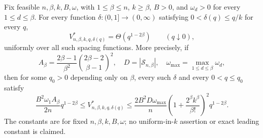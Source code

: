 Fix feasible \(n,\beta,k,B,\omega\), with \(1\le\beta\le n\), \(k\ge\beta\), \(B>0\), and \(\omega_d>0\) for every \(1\le d\le\beta\).  For every function \(\delta:(0,1]\to(0,\infty)\) satisfying \(0<\delta(q)\le q/k\) for every \(q\),
\[
V^*_{n,\beta,k,q,\delta(q)}=\Theta(q^{1-2\beta})
\qquad(q\downarrow0),
\]
uniformly over all such spacing functions.  More precisely, if
\[
A_\beta=\frac{2\beta-1}{\beta^2}
\binom{2\beta-2}{\beta-1}^{\!2},
\quad D=|\mathcal S_{n,\beta}|,
\quad \omega_{\max}=\max_{1\le d\le\beta}\omega_d,
\]
then for some \(q_0>0\) depending only on \(\beta\), every such \(\delta\) and every \(0<q\le q_0\) satisfy
\[
\frac{B^2\omega_1A_\beta}{2n}q^{1-2\beta}
\le V^*_{n,\beta,k,q,\delta(q)}
\le\frac{2B^2D\omega_{\max}}{n}
\left(1+\frac{2^\beta k^\beta}{\beta!}\right)^2q^{1-2\beta}.
\]
The constants are for fixed \(n,\beta,k,B,\omega\); no uniform-in-\(k\) assertion or exact leading constant is claimed.